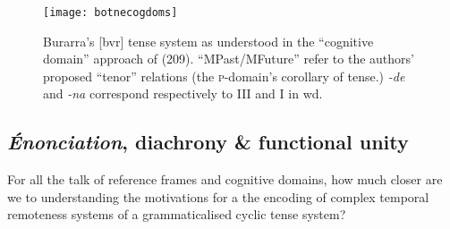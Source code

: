 \begin{figure}
	\centering
	\caption{Burarra's [\gls{bvr}] tense system as understood in the ``cognitive domain'' approach of \citealp{Botne2008} (209). ``MPast/MFuture'' refer to the authors' proposed ``tenor'' relations (the \textsc{p}-domain's corollary of tense.) \textit{-de} and \textit{-na} correspond respectively to \gls{III} and \gls{I} in \gls{wd}.}
	\label{fig:botne}
	\texttt{[image: botnecogdoms]}
\end{figure}

\subsection{\textit{Énonciation}, diachrony \& functional unity}

For all the talk of reference frames and cognitive domains, how much closer are we to understanding the motivations for a the encoding of complex temporal remoteness systems of a grammaticalised cyclic tense system?

